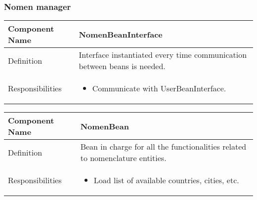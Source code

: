 \documentclass[a4paper,12pt]{book}
\begin{document}
\subsubsection{Nomen manager}
\begin{center}
  \begin{tabular}{ | p{3.3cm} | p{11.7cm} | }
    \hline
    Component Name & \textbf{NomenBeanInterface} \\ \hline
    Definition & Interface instantiated every time communication between beans is needed. \\ \hline
    Responsibilities & \parbox{0.65\textwidth}{
      \begin{itemize}[noitemsep,leftmargin=*]
        \item Communicate with UserBeanInterface.
      \end{itemize}} \\ \hline
    \end{tabular}
  \end{center}
  \begin{center}
    \begin{tabular}{ | p{3.3cm} | p{11.7cm} | }
      \hline
      Component Name & \textbf{NomenBean} \\ \hline
      Definition & Bean in charge for all the functionalities related to nomenclature entities. \\ \hline
      Responsibilities & \parbox{0.65\textwidth}{
        \begin{itemize}[noitemsep,leftmargin=*]
          \item Load list of available countries, cities, etc.
        \end{itemize}} \\ \hline
      \end{tabular}
    \end{center}
\end{document}
